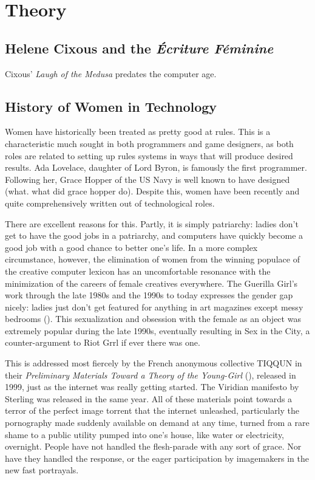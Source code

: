 
\section{Theory}

\subsection{Helene Cixous and the \textit{Écriture Féminine}}
Cixous' \textit{Laugh of the Medusa} predates the computer age. 


\subsection{History of Women in Technology}
Women have historically been treated as pretty good at rules. This is a characteristic much sought in both programmers and game designers, as both roles are related to setting up rules systems in ways that will produce desired results. Ada Lovelace, daughter of Lord Byron, is famously the first programmer. Following her, Grace Hopper of the US Navy is well known to have designed (what. what did grace hopper do). Despite this, women have been recently and quite comprehensively written out of technological roles.

There are excellent reasons for this. Partly, it is simply patriarchy: ladies don't get to have the good jobs in a patriarchy, and computers have quickly become a good job with a good chance to better one's life. In a more complex circumstance, however, the elimination of women from the winning populace of the creative computer lexicon has an uncomfortable resonance with the minimization of the careers of female creatives everywhere. The Guerilla Girl's work through the late 1980s and the 1990s to today expresses the gender gap nicely: ladies just don't get featured for anything in art magazines except messy bedrooms (\cite{emin}). This sexualization and obsession with the female as an object was extremely popular during the late 1990s, eventually resulting in Sex in the City, a counter-argument to Riot Grrl if ever there was one. 

This is addressed most fiercely by the French anonymous collective TIQQUN in their \textit{Preliminary Materials Toward a Theory of the Young-Girl} (\cite{tiqqun}), released in 1999, just as the internet was really getting started. The Viridian manifesto by Sterling was released in the same year. All of these materials point towards a terror of the perfect image torrent that the internet unleashed, particularly the pornography made suddenly available on demand at any time, turned from a rare shame to a public utility pumped into one's house, like water or electricity, overnight. People have not handled the flesh-parade with any sort of grace. Nor have they handled the response, or the eager participation by imagemakers in the new fast portrayals.

